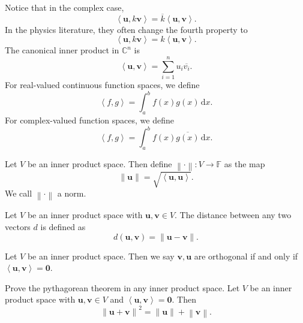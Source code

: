 	Notice that in the complex case,
	\[
		\left<\mathbf{u},k \mathbf{v} \right> = \overline{k} \left<\mathbf{u},\mathbf{v} \right>
	.\]
In the physics literature, they often change the fourth property to
\[
	\left<\mathbf{u},k \mathbf{v} \right> = k \left<\mathbf{u},\mathbf{v} \right>
.\]
The canonical inner product in $\mathbb{C}^n$ is
\[
	\left<\mathbf{u},\mathbf{v} \right> = \sum_{i=1}^{n} u_i \overline{v_i}
.\]
For real-valued continuous function spaces, we define 
\[
	\left<f,g \right> = \int_{a}^{b} f(x)g(x) \,\mathrm{d} x
.\]
For complex-valued function spaces, we define 
\[
	\left<f,g \right> = \int_{a}^{b}f(x)\overline{g(x)}  \,\mathrm{d} x
.\]
\begin{definition}[Norm]\label{dfn:N}
	Let $V$ be an inner product space. Then define $\left\lVert \cdot  \right\rVert : V \to \mathbb{F}$ as the map
	\[
		\left\lVert \mathbf{u} \right\rVert =\sqrt{\left<\mathbf{u},\mathbf{u} \right>} 
	.\]
	We call $\left\lVert \cdot  \right\rVert $ a norm.
\end{definition}
\begin{definition}[Distance]\label{dfn:dis}
	Let $V$ be an inner product space with $\mathbf{u},\mathbf{v}\in V$. The distance between any two vectors $d$ is defined as
	\[
		d(\mathbf{u},\mathbf{v})=\left\lVert \mathbf{u}-\mathbf{v} \right\rVert 
	.\]
\end{definition}
\begin{definition}[Orthogonal]\label{dfn:orth}
	Let $V$ be an inner product space. Then we say $\mathbf{v},\mathbf{u}$ are orthogonal if and only if $\left<\mathbf{u},\mathbf{v} \right> = \mathbf{0}$.
\end{definition}
\begin{exercise}
	Prove the pythagorean theorem in any inner product space. Let $V$ be an inner product space with $\mathbf{u},\mathbf{v}\in V$ and $\left<\mathbf{u},\mathbf{v} \right> = \mathbf{0}$. Then 
	\[
		\left\lVert \mathbf{u}+\mathbf{v} \right\rVert ^2 = \left\lVert \mathbf{u} \right\rVert +\left\lVert \mathbf{v} \right\rVert 
	.\]
\end{exercise}
